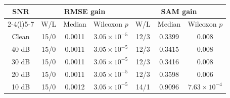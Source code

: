 \begin{tabular}{@{}c ccc ccc@{}}
\toprule
\multirow{2}{*}{SNR} &
\multicolumn{3}{c}{RMSE gain} &
\multicolumn{3}{c}{SAM gain} \\
\cmidrule(lr){2-4}\cmidrule(l){5-7}
& W/L & Median & Wilcoxon $p$ & W/L & Median & Wilcoxon $p$ \\
\midrule
Clean & 15/0 & 0.0011 & $3.05\times10^{-5}$ & 12/3 & 0.3399 & 0.008 \\
40 dB & 15/0 & 0.0011 & $3.05\times10^{-5}$ & 12/3 & 0.3415 & 0.008 \\
30 dB & 15/0 & 0.0011 & $3.05\times10^{-5}$ & 12/3 & 0.3416 & 0.008 \\
20 dB & 15/0 & 0.0011 & $3.05\times10^{-5}$ & 12/3 & 0.3598 & 0.006 \\
10 dB & 15/0 & 0.0012 & $3.05\times10^{-5}$ & 14/1 & 0.9096 & $7.63\times10^{-4}$ \\
\bottomrule
\end{tabular}
